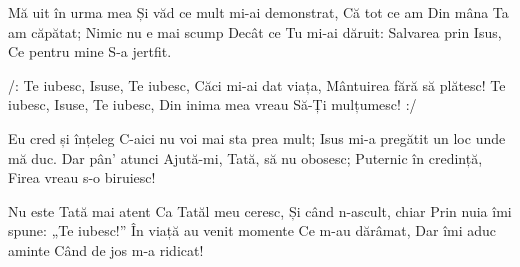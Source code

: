 \beginverse
Mă uit în urma mea
Și văd ce mult mi-ai demonstrat,
Că tot ce am
Din mâna Ta am căpătat;
Nimic nu e mai scump
Decât ce Tu mi-ai dăruit:
Salvarea prin Isus,
Ce pentru mine S-a jertfit.
\endverse

\beginchorus
/: Te iubesc, Isuse,
Te iubesc,
Căci mi-ai dat viața,
Mântuirea fără să plătesc!
Te iubesc, Isuse,
Te iubesc,
Din inima mea vreau
Să-Ți mulțumesc! :/
\endchorus

\beginverse
Eu cred și înțeleg
C-aici nu voi mai sta prea mult;
Isus mi-a pregătit un loc unde mă duc.
Dar pân' atunci
Ajută-mi, Tată, să nu obosesc;
Puternic în credință,
Firea vreau s-o biruiesc!
\endverse

\beginverse
Nu este Tată mai atent
Ca Tatăl meu ceresc,
Și când n-ascult, chiar
Prin nuia îmi spune:
„Te iubesc!”
În viață au venit momente
Ce m-au dărâmat,
Dar îmi aduc aminte
Când de jos m-a ridicat!
\endverse
\endsong